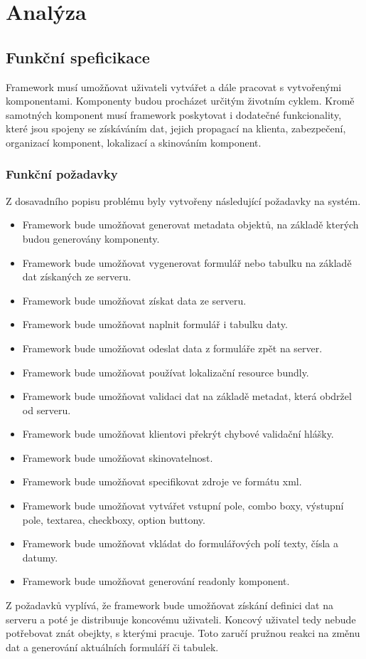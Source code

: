 \chapter{Analýza}
\section{Funkční speficikace}
Framework musí umožňovat uživateli vytvářet a dále pracovat s vytvořenými komponentami. Komponenty budou procházet určitým životním cyklem. Kromě samotných komponent musí framework poskytovat i dodatečné funkcionality, které jsou spojeny se získáváním dat, jejich propagací na klienta, zabezpečení, organizací komponent, lokalizací a skinováním komponent.
\subsection{Funkční požadavky}
Z dosavadního popisu problému byly vytvořeny následující požadavky na systém.
\begin{itemize}
\item Framework bude umožňovat generovat metadata objektů, na základě kterých budou generovány komponenty.
\item Framework bude umožňovat vygenerovat formulář nebo tabulku na základě dat získaných ze serveru.
\item Framework bude umožňovat získat data ze serveru.
\item Framework bude umožňovat naplnit formulář i tabulku daty.
\item Framework bude umožňovat odeslat data z formuláře zpět na server.
\item Framework bude umožňovat používat lokalizační resource bundly.
\item Framework bude umožňovat validaci dat na základě metadat, která obdržel od serveru.
\item Framework bude umožňovat klientovi překrýt chybové validační hlášky.
\item Framework bude umožňovat skinovatelnost.
\item Framework bude umožňovat specifikovat zdroje ve formátu xml.
\item Framework bude umožňovat vytvářet vstupní pole, combo boxy, výstupní pole, textarea, checkboxy, option buttony.
\item Framework bude umožňovat vkládat do formulářových polí texty, čísla a datumy.
\item Framework bude umožňovat generování readonly komponent. 
\end{itemize} 
Z požadavků vyplívá, že framework bude umožňovat získání definici dat na serveru a poté je distribuuje koncovému uživateli. Koncový uživatel tedy nebude potřebovat znát obejkty, s kterými pracuje. Toto zaručí pružnou reakci na změnu dat a generování aktuálních formuláří či tabulek. 
